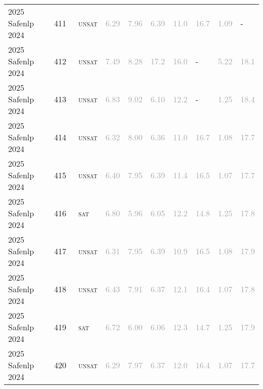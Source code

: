 \begin{center}
{\begin{longtable}{@{}llllllllll@{}}
2025 Safenlp 2024 & 411 & ~\textsc{unsat} & \textcolor{darkgray}{6.29} & \textcolor{darkgray}{7.96} & \textcolor{darkgray}{6.39} & \textcolor{darkgray}{11.0} & \textcolor{darkgray}{16.7} & \textcolor{darkgray}{1.09} & - \\
2025 Safenlp 2024 & 412 & ~\textsc{unsat} & \textcolor{darkgray}{7.49} & \textcolor{darkgray}{8.28} & \textcolor{darkgray}{17.2} & \textcolor{darkgray}{16.0} & - & \textcolor{darkgray}{5.22} & \textcolor{darkgray}{18.1} \\
2025 Safenlp 2024 & 413 & ~\textsc{unsat} & \textcolor{darkgray}{6.83} & \textcolor{darkgray}{9.02} & \textcolor{darkgray}{6.10} & \textcolor{darkgray}{12.2} & - & \textcolor{darkgray}{1.25} & \textcolor{darkgray}{18.4} \\
2025 Safenlp 2024 & 414 & ~\textsc{unsat} & \textcolor{darkgray}{6.32} & \textcolor{darkgray}{8.00} & \textcolor{darkgray}{6.36} & \textcolor{darkgray}{11.0} & \textcolor{darkgray}{16.7} & \textcolor{darkgray}{1.08} & \textcolor{darkgray}{17.7} \\
2025 Safenlp 2024 & 415 & ~\textsc{unsat} & \textcolor{darkgray}{6.40} & \textcolor{darkgray}{7.95} & \textcolor{darkgray}{6.39} & \textcolor{darkgray}{11.4} & \textcolor{darkgray}{16.5} & \textcolor{darkgray}{1.07} & \textcolor{darkgray}{17.7} \\
2025 Safenlp 2024 & 416 & ~\textsc{sat} & \textcolor{darkgray}{6.80} & \textcolor{darkgray}{5.96} & \textcolor{darkgray}{6.05} & \textcolor{darkgray}{12.2} & \textcolor{darkgray}{14.8} & \textcolor{darkgray}{1.25} & \textcolor{darkgray}{17.8} \\
2025 Safenlp 2024 & 417 & ~\textsc{unsat} & \textcolor{darkgray}{6.31} & \textcolor{darkgray}{7.95} & \textcolor{darkgray}{6.39} & \textcolor{darkgray}{10.9} & \textcolor{darkgray}{16.5} & \textcolor{darkgray}{1.08} & \textcolor{darkgray}{17.9} \\
2025 Safenlp 2024 & 418 & ~\textsc{unsat} & \textcolor{darkgray}{6.43} & \textcolor{darkgray}{7.91} & \textcolor{darkgray}{6.37} & \textcolor{darkgray}{12.1} & \textcolor{darkgray}{16.4} & \textcolor{darkgray}{1.07} & \textcolor{darkgray}{17.8} \\
2025 Safenlp 2024 & 419 & ~\textsc{sat} & \textcolor{darkgray}{6.72} & \textcolor{darkgray}{6.00} & \textcolor{darkgray}{6.06} & \textcolor{darkgray}{12.3} & \textcolor{darkgray}{14.7} & \textcolor{darkgray}{1.25} & \textcolor{darkgray}{17.9} \\
2025 Safenlp 2024 & 420 & ~\textsc{unsat} & \textcolor{darkgray}{6.29} & \textcolor{darkgray}{7.97} & \textcolor{darkgray}{6.37} & \textcolor{darkgray}{12.0} & \textcolor{darkgray}{16.4} & \textcolor{darkgray}{1.07} & \textcolor{darkgray}{17.7} \\

\end{longtable}}
\end{center}
